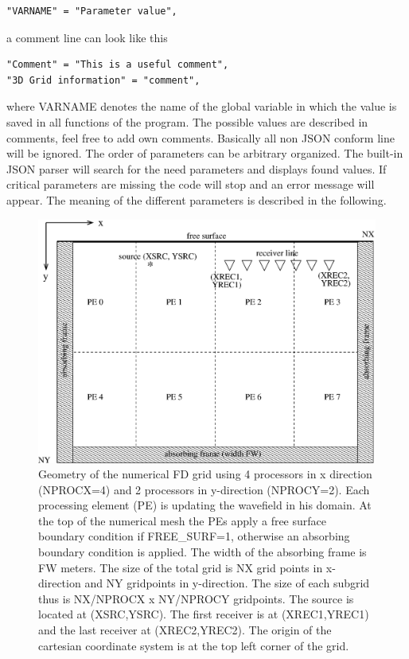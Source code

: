 \documentclass[11pt,onecolumn,oneside]{article}
\begin{document}
\begin{verbatim}
"VARNAME" = "Parameter value",
\end{verbatim}

a comment line can look like this

\begin{verbatim}
"Comment" = "This is a useful comment",
"3D Grid information" = "comment",
\end{verbatim}

where VARNAME denotes the name of the global variable in which the value is saved in all functions of the program. The possible values are described in comments, feel free to add own comments. Basically all non JSON conform line will be ignored. The order of parameters can be arbitrary organized. The built-in JSON parser will search for the need parameters and displays found values. If critical parameters are missing the code will stop and an error message will appear. The meaning of the different parameters is described in the following.

\begin{figure}
\begin{center}
\includegraphics[width=15cm,angle=0]{eps/grid.eps}
\end{center}
\caption{Geometry of the numerical FD grid using 4 processors in x direction (NPROCX=4) and 2 processors in y-direction (NPROCY=2). Each processing element (PE) is updating the wavefield in his domain.
At the top of the numerical mesh the PEs apply a free surface boundary condition if FREE\_SURF=1, otherwise an absorbing boundary condition is applied. The width of the absorbing frame is FW meters. The size of the total grid is NX grid points in x-direction and NY gridpoints in y-direction. The size of each subgrid thus is NX/NPROCX x NY/NPROCY gridpoints. The source is located at (XSRC,YSRC). The first receiver is at (XREC1,YREC1) and the last receiver at (XREC2,YREC2). The origin of the cartesian coordinate system is at the top left corner of the grid. }
\label{fig_grid}
\end{figure}
\newpage
\end{document}
